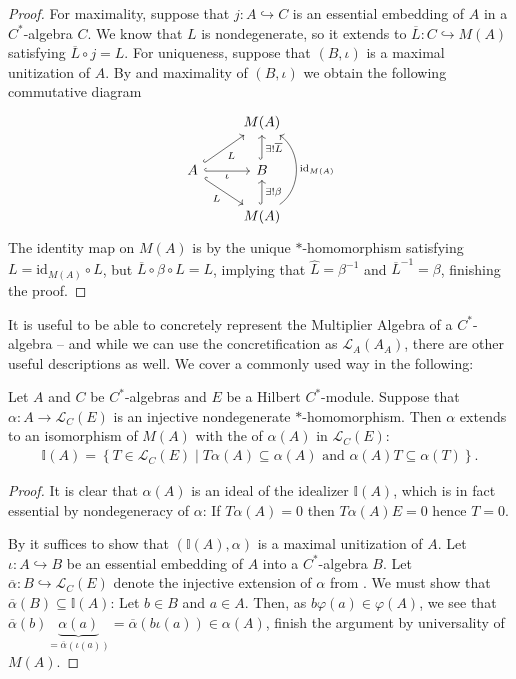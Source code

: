 \begin{proof}
	For maximality, suppose that $j \colon A \hookrightarrow C$ is an essential embedding of $A$ in a $C^*$-algebra $C$. We know that $L$ is nondegenerate, so it extends to $\overline{L} \colon C \hookrightarrow M(A)$ satisfying $\overline{L} \circ j = L$. For uniqueness, suppose that $(B,\iota)$ is a maximal unitization of $A$. By  and maximality of $(B,\iota)$ we obtain the following commutative diagram
	\begin{equation}
		\begin{tikzcd}
	 		& M(A)\\
			A\arrow[rd, " L" ',hook] \arrow[r, "\iota"', hook] \arrow[ru, "L"', hook] & B \ar[u , "\exists !\overline L"', hook ]\\
			& M(A) \arrow[u, "\exists ! \beta"', hook] \ar[uu, "\mathrm{id}_{M(A)}"', bend right  = 55]
		\end{tikzcd}
	\end{equation}
	The identity map on $M(A)$ is by  the unique $*$-homomorphism satisfying $L = \mathrm{id}_{M(A)} \circ L$, but $\overline L \circ \beta \circ L = L$, implying that $\hat L = \beta^{-1}$ and $\overline L^{-1} = \beta$, finishing the proof.
\end{proof}

It is useful to be able to concretely represent the Multiplier Algebra of a $C^*$-algebra -- and while we can use the concretification as $\mathcal{L}_A(A_A)$, there are other useful descriptions as well. We cover a commonly used way in the following:
\begin{proposition}
	Let $A$ and $C$ be $C^*$-algebras and $E$ be a Hilbert $C^*$-module. Suppose that $\alpha \colon A \to \mathcal{L}_C(E)$ is an injective nondegenerate $*$-homomorphism. Then $\alpha$ extends to an isomorphism of $M(A)$ with the   of $\alpha(A)$ in $\mathcal{L}_C(E)$:
	\begin{align*}
		\mathbb{I}(A)=\left\{ T \in \mathcal{L}_C(E) \mid T\alpha(A) \subseteq \alpha(A) \text{ and } \alpha(A)T \subseteq \alpha(T) \right\}.	
	\end{align*}
	\label{mult:idealizerismax}
\end{proposition}
\begin{proof}
	It is clear that $\alpha(A)$ is an ideal of the idealizer $\mathbb{I}(A)$, which is in fact essential by nondegeneracy of $\alpha$: If $T\alpha(A) = 0$ then $T\alpha(A)E = 0$ hence $T =0$.

By  it suffices to show that $(\mathbb{I}(A),\alpha)$ is a maximal unitization of $A$. Let $\iota \colon A \hookrightarrow B$ be an essential embedding of $A$ into a $C^*$-algebra $B$. Let $\overline \alpha \colon B \hookrightarrow \mathcal{L}_C(E)$ denote the injective extension of $\alpha$ from . We must show that $\overline \alpha(B) \subseteq \mathbb{I}(A)$: Let $b \in B$ and $a \in A$. Then, as $b \varphi(a) \in \varphi(A)$, we see that $\overline \alpha(b) \underbrace{\alpha(a)}_{=\overline \alpha (\iota(a))} = \overline \alpha(b \iota(a)) \in \alpha(A)$, finish the argument by universality of $M(A)$.
\end{proof}

